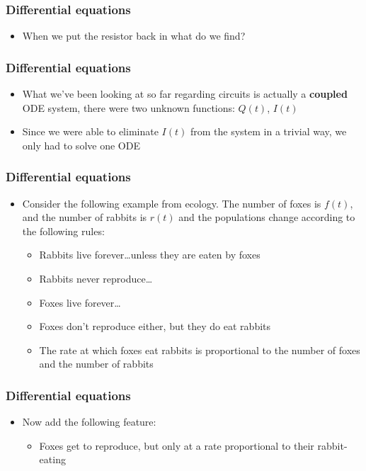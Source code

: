 \documentclass{beamer}
\begin{document}
\begin{frame}
  \frametitle{Differential equations}
  \begin{itemize}
    \item<1-> When we put the resistor back in what do we find?
  \end{itemize}
\end{frame}

\begin{frame}
  \frametitle{Differential equations}
  \begin{itemize}
    \item<1-> What we've been looking at so far regarding circuits is actually a \textbf{coupled} ODE system, there were two unknown functions: $Q(t)$, $I(t)$
    \item<2-> Since we were able to eliminate $I(t)$ from the system in a trivial way, we only had to solve one ODE
  \end{itemize}
\end{frame}

\begin{frame}
  \frametitle{Differential equations}
  \begin{itemize}
    \item<1-> Consider the following example from ecology. The number of foxes is $f(t)$, and the number of rabbits is $r(t)$ and the populations change according to the following rules:
      \begin{itemize}
	\item<2-> Rabbits live forever\ldots unless they are eaten by foxes
	\item<3-> Rabbits never reproduce\ldots
	\item<4-> Foxes live forever\ldots
	\item<5-> Foxes don't reproduce either, but they do eat rabbits
	\item<6-> The rate at which foxes eat rabbits is proportional to the number of foxes and the number of rabbits
      \end{itemize}
  \end{itemize}
\end{frame}

\begin{frame}
  \frametitle{Differential equations}
  \begin{itemize}
    \item<1-> Now add the following feature:
      \begin{itemize}
	\item<2-> Foxes get to reproduce, but only at a rate proportional to their rabbit-eating
      \end{itemize}
  \end{itemize}
\end{frame}
\end{document}
